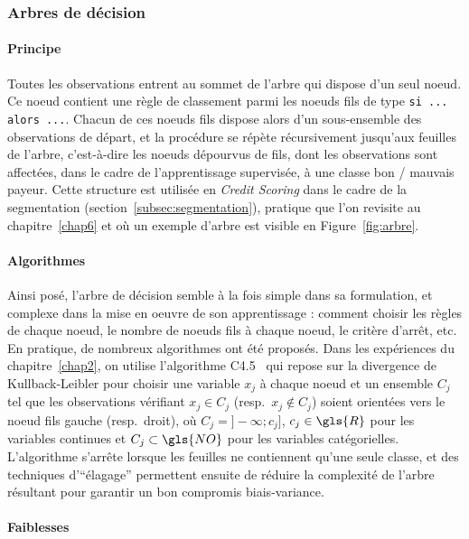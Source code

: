 \subsubsection{Arbres de décision}

\paragraph{Principe}

Toutes les observations entrent au sommet de l'arbre qui dispose d'un seul noeud. Ce noeud contient une règle de classement parmi les noeuds fils de type \verb|si ... alors ...|. Chacun de ces noeuds fils dispose alors d'un sous-ensemble des observations de départ, et la procédure se répète récursivement jusqu'aux feuilles de l'arbre, c'est-à-dire les noeuds dépourvus de fils, dont les observations sont affectées, dans le cadre de l'apprentissage supervisée, à une classe bon / mauvais payeur. Cette structure est utilisée en \textit{Credit Scoring} dans le cadre de la segmentation (section~\ref{subsec:segmentation}), pratique que l'on revisite au chapitre~\ref{chap6} et où un exemple d'arbre est visible en Figure~\ref{fig:arbre}.

\paragraph{Algorithmes}

Ainsi posé, l'arbre de décision semble à la fois simple dans sa formulation, et complexe dans la mise en oeuvre de son apprentissage : comment choisir les règles de chaque noeud, le nombre de noeuds fils à chaque noeud, le critère d'arrêt, etc. En pratique, de nombreux algorithmes ont été proposés. Dans les expériences du chapitre~\ref{chap2}, on utilise l'algorithme C4.5~\cite{quinlan2014c4} qui repose sur la divergence de Kullback-Leibler pour choisir une variable $x_j$ à chaque noeud et un ensemble $C_j$ tel que les observations vérifiant $x_j \in C_j$ (resp.\ $x_j \not\in C_j$) soient orientées vers le noeud fils gauche (resp.\ droit), où $C_j = ]- \infty ; c_j]$, $c_j \in \gls{R}$ pour les variables continues et $C_j \subset \gls{NO}$ pour les variables catégorielles. L'algorithme s'arrête lorsque les feuilles ne contiennent qu'une seule classe, et des techniques d'``élagage'' permettent ensuite de réduire la complexité de l'arbre résultant pour garantir un bon compromis biais-variance.

\paragraph{Faiblesses}

